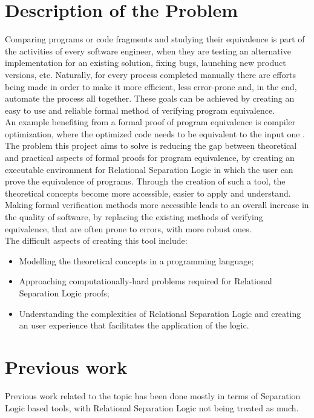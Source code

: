 \documentclass[12pt,a4paper]{article}
\begin{document}
\section{Description of the Problem}
Comparing programs or code fragments and studying their equivalence is part of the activities of every software engineer, when they are testing an alternative implementation for an existing solution, fixing bugs, launching new product versions, etc. Naturally, for every process completed manually there are efforts being made in order to make it more efficient, less error-prone and, in the end, automate the process all together. These goals can be achieved by creating an easy to use and reliable formal  method of verifying program equivalence.
\\

An example benefiting from a formal proof of program equivalence is compiler optimization, where the optimized code needs to be equivalent to the input one \cite{relational}.\\

The problem this project aims to solve is reducing the gap between theoretical and practical aspects of formal proofs for program equivalence, by creating an executable environment for Relational Separation Logic in which the user can prove the equivalence of programs. Through the creation of such a tool, the theoretical concepts become more accessible, easier to apply and understand. Making formal verification methods more accessible leads to an overall increase in the quality of software, by replacing the existing methods of verifying equivalence, that are often prone to errors, with more robust ones.\\

The difficult aspects of creating this tool include:
\begin{itemize}
	\item Modelling the theoretical concepts in a programming language;
	\item Approaching computationally-hard problems required for Relational Separation Logic proofs;
	\item Understanding the complexities of Relational Separation Logic and creating an user experience that facilitates the application of the logic.
\end{itemize}

\section{Previous work}
Previous work related to the topic has been done mostly in terms of Separation Logic based tools, with Relational Separation Logic not being treated as much. \\
\end{document}
